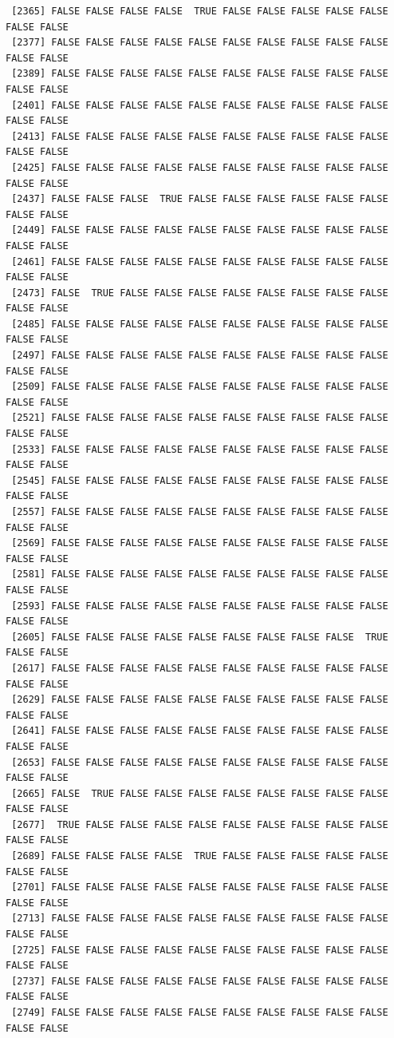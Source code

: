 \documentclass[
  a4paper,
  DIV=11,
  numbers=noendperiod]{scrartcl}
\begin{document}
\begin{verbatim}
 [2365] FALSE FALSE FALSE FALSE  TRUE FALSE FALSE FALSE FALSE FALSE FALSE FALSE
 [2377] FALSE FALSE FALSE FALSE FALSE FALSE FALSE FALSE FALSE FALSE FALSE FALSE
 [2389] FALSE FALSE FALSE FALSE FALSE FALSE FALSE FALSE FALSE FALSE FALSE FALSE
 [2401] FALSE FALSE FALSE FALSE FALSE FALSE FALSE FALSE FALSE FALSE FALSE FALSE
 [2413] FALSE FALSE FALSE FALSE FALSE FALSE FALSE FALSE FALSE FALSE FALSE FALSE
 [2425] FALSE FALSE FALSE FALSE FALSE FALSE FALSE FALSE FALSE FALSE FALSE FALSE
 [2437] FALSE FALSE FALSE  TRUE FALSE FALSE FALSE FALSE FALSE FALSE FALSE FALSE
 [2449] FALSE FALSE FALSE FALSE FALSE FALSE FALSE FALSE FALSE FALSE FALSE FALSE
 [2461] FALSE FALSE FALSE FALSE FALSE FALSE FALSE FALSE FALSE FALSE FALSE FALSE
 [2473] FALSE  TRUE FALSE FALSE FALSE FALSE FALSE FALSE FALSE FALSE FALSE FALSE
 [2485] FALSE FALSE FALSE FALSE FALSE FALSE FALSE FALSE FALSE FALSE FALSE FALSE
 [2497] FALSE FALSE FALSE FALSE FALSE FALSE FALSE FALSE FALSE FALSE FALSE FALSE
 [2509] FALSE FALSE FALSE FALSE FALSE FALSE FALSE FALSE FALSE FALSE FALSE FALSE
 [2521] FALSE FALSE FALSE FALSE FALSE FALSE FALSE FALSE FALSE FALSE FALSE FALSE
 [2533] FALSE FALSE FALSE FALSE FALSE FALSE FALSE FALSE FALSE FALSE FALSE FALSE
 [2545] FALSE FALSE FALSE FALSE FALSE FALSE FALSE FALSE FALSE FALSE FALSE FALSE
 [2557] FALSE FALSE FALSE FALSE FALSE FALSE FALSE FALSE FALSE FALSE FALSE FALSE
 [2569] FALSE FALSE FALSE FALSE FALSE FALSE FALSE FALSE FALSE FALSE FALSE FALSE
 [2581] FALSE FALSE FALSE FALSE FALSE FALSE FALSE FALSE FALSE FALSE FALSE FALSE
 [2593] FALSE FALSE FALSE FALSE FALSE FALSE FALSE FALSE FALSE FALSE FALSE FALSE
 [2605] FALSE FALSE FALSE FALSE FALSE FALSE FALSE FALSE FALSE  TRUE FALSE FALSE
 [2617] FALSE FALSE FALSE FALSE FALSE FALSE FALSE FALSE FALSE FALSE FALSE FALSE
 [2629] FALSE FALSE FALSE FALSE FALSE FALSE FALSE FALSE FALSE FALSE FALSE FALSE
 [2641] FALSE FALSE FALSE FALSE FALSE FALSE FALSE FALSE FALSE FALSE FALSE FALSE
 [2653] FALSE FALSE FALSE FALSE FALSE FALSE FALSE FALSE FALSE FALSE FALSE FALSE
 [2665] FALSE  TRUE FALSE FALSE FALSE FALSE FALSE FALSE FALSE FALSE FALSE FALSE
 [2677]  TRUE FALSE FALSE FALSE FALSE FALSE FALSE FALSE FALSE FALSE FALSE FALSE
 [2689] FALSE FALSE FALSE FALSE  TRUE FALSE FALSE FALSE FALSE FALSE FALSE FALSE
 [2701] FALSE FALSE FALSE FALSE FALSE FALSE FALSE FALSE FALSE FALSE FALSE FALSE
 [2713] FALSE FALSE FALSE FALSE FALSE FALSE FALSE FALSE FALSE FALSE FALSE FALSE
 [2725] FALSE FALSE FALSE FALSE FALSE FALSE FALSE FALSE FALSE FALSE FALSE FALSE
 [2737] FALSE FALSE FALSE FALSE FALSE FALSE FALSE FALSE FALSE FALSE FALSE FALSE
 [2749] FALSE FALSE FALSE FALSE FALSE FALSE FALSE FALSE FALSE FALSE FALSE FALSE

\end{verbatim}
\end{document}
